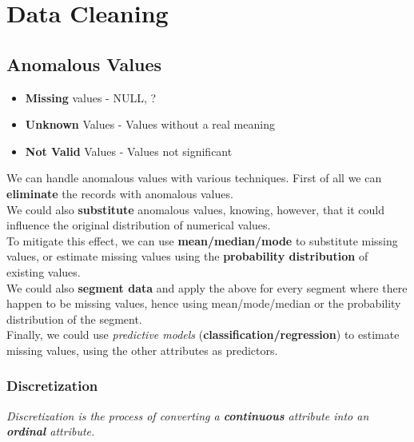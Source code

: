 \chapter{Data Cleaning}


\section{Anomalous Values}
\begin{itemize}
	\item \textbf{Missing} values - NULL, ?
	\item \textbf{Unknown} Values - Values without a real meaning
	\item \textbf{Not Valid} Values - Values not significant
\end{itemize}

We can handle anomalous values with various techniques.
First of all we can \textbf{eliminate} the records with anomalous values.\\
We could also \textbf{substitute} anomalous values, knowing, however, that it could influence the original distribution of numerical values.\\
To mitigate this effect, we can use \textbf{mean/median/mode} to substitute missing values, or estimate missing values using the \textbf{probability distribution} of existing values.\\
We could also \textbf{segment data} and apply the above for every segment where there happen to be missing values, hence using mean/mode/median or the probability distribution of the segment.\\
Finally, we could use \textit{predictive models} (\textbf{classification/regression}) to estimate missing values, using the other attributes as predictors.

\subsection{Discretization}
\textit{Discretization is the process of converting a
\textbf{continuous} attribute into an \textbf{ordinal} attribute.}


